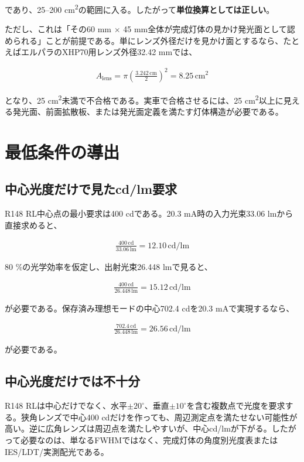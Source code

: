\documentclass[11pt,a4paper]{article}
\begin{document}
であり、25--200 cm\textsuperscript{2}の範囲に入る。したがって\textbf{単位換算としては正しい}。

ただし、これは「その60 mm $\times$ 45 mm全体が完成灯体の見かけ発光面として認められる」ことが前提である。単にレンズ外径だけを見かけ面とするなら、たとえばエルパラのXHP70用レンズ外径32.42 mmでは、

\begin{align}
A_\mathrm{lens}=\pi\left(\frac{3.242\,\mathrm{cm}}{2}\right)^2=8.25\,\mathrm{cm^2}
\end{align}

となり、25 cm\textsuperscript{2}未満で不合格である。実車で合格させるには、25 cm\textsuperscript{2}以上に見える発光面、前面拡散板、または発光面定義を満たす灯体構造が必要である。

\section{最低条件の導出}
\subsection{中心光度だけで見たcd/lm要求}
R148 RL中心点の最小要求は400 cdである。20.3 mA時の入力光束33.06 lmから直接求めると、

\begin{align}
\frac{400\,\mathrm{cd}}{33.06\,\mathrm{lm}}=12.10\,\mathrm{cd/lm}
\end{align}

80 \%の光学効率を仮定し、出射光束26.448 lmで見ると、

\begin{align}
\frac{400\,\mathrm{cd}}{26.448\,\mathrm{lm}}=15.12\,\mathrm{cd/lm}
\end{align}

が必要である。保存済み理想モードの中心702.4 cdを20.3 mAで実現するなら、

\begin{align}
\frac{702.4\,\mathrm{cd}}{26.448\,\mathrm{lm}}=26.56\,\mathrm{cd/lm}
\end{align}

が必要である。

\subsection{中心光度だけでは不十分}
R148 RLは中心だけでなく、水平$\pm20^\circ$、垂直$\pm10^\circ$を含む複数点で光度を要求する。狭角レンズで中心400 cdだけを作っても、周辺測定点を満たせない可能性が高い。逆に広角レンズは周辺点を満たしやすいが、中心cd/lmが下がる。したがって必要なのは、単なるFWHMではなく、完成灯体の角度別光度表またはIES/LDT/実測配光である。
\end{document}
